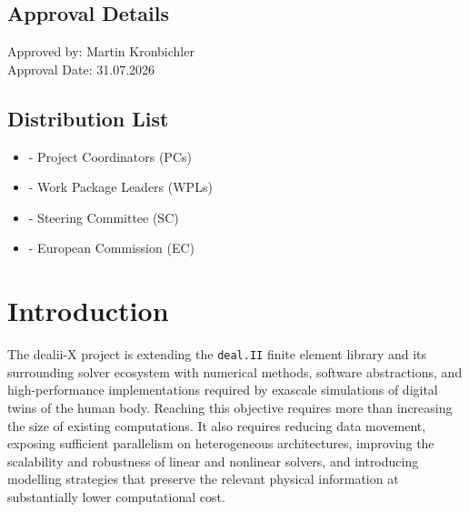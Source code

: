 \documentclass[a4paper,12pt]{article}
\begin{document}
\subsection*{{Approval Details}}
Approved by: Martin Kronbichler \\
Approval Date: 31.07.2026

\subsection*{{Distribution List}}
\begin{itemize}
    \item [] - Project Coordinators (PCs)
    \item [] - Work Package Leaders (WPLs)
    \item [] - Steering Committee (SC)
    \item [] - European Commission (EC)
\end{itemize}

\vspace*{2cm}

\disclaimer

\newpage

\tableofcontents %

\newpage

\section{{Introduction}}

The dealii-X project is extending the \texttt{deal.II} finite element library and its surrounding solver ecosystem with numerical methods, software abstractions, and high-performance implementations required by exascale simulations of digital twins of the human body. Reaching this objective requires more than increasing the size of existing computations. It also requires reducing data movement, exposing sufficient parallelism on heterogeneous architectures, improving the scalability and robustness of linear and nonlinear solvers, and introducing modelling strategies that preserve the relevant physical information at substantially lower computational cost.
\end{document}
